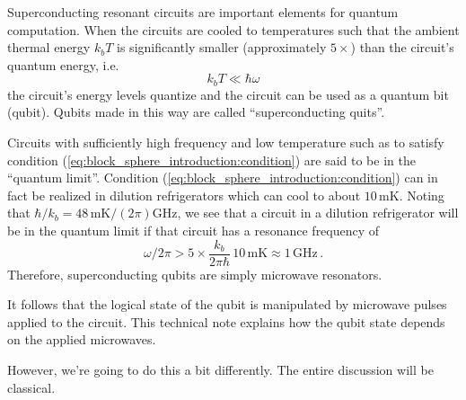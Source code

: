 
Superconducting resonant circuits are important elements for quantum computation.
When the circuits are cooled to temperatures such that the ambient thermal energy $k_b T$ is significantly smaller (approximately $5\times$) than the circuit's quantum energy, i.e.
\begin{equation}
  k_b T \ll \hbar \omega \label{eq:block_sphere_introduction:condition}
\end{equation}
the circuit's energy levels quantize and the circuit can be used as a quantum bit (qubit).
Qubits made in this way are called ``superconducting quits''.

Circuits with sufficiently high frequency and low temperature such as to satisfy condition (\ref{eq:block_sphere_introduction:condition}) are said to be in the ``quantum limit''.
Condition (\ref{eq:block_sphere_introduction:condition}) can in fact be realized in dilution refrigerators which can cool to about $10\,\text{mK}$.
Noting that $\hbar / k_b = 48\,\text{mK} / (2 \pi) \text{GHz}$, we see that a circuit in a dilution refrigerator will be in the quantum limit if that circuit has a resonance frequency of
\begin{equation}
  \omega / 2 \pi > 5 \times \frac{k_b}{2\pi \hbar} \, 10\,\text{mK} \approx 1 \, \text{GHz}
  \, .
\end{equation}
Therefore, superconducting qubits are simply microwave resonators.

It follows that the logical state of the qubit is manipulated by microwave pulses applied to the circuit.
This technical note explains how the qubit state depends on the applied microwaves.

However, we're going to do this a bit differently.
The entire discussion will be classical.
